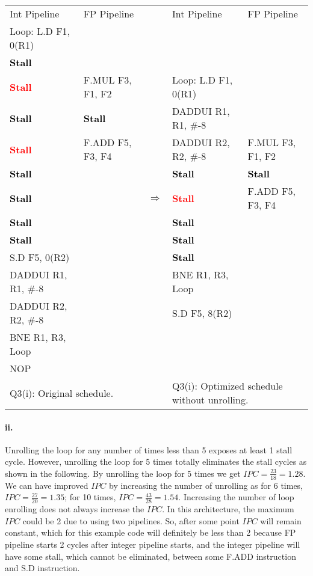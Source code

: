 \documentclass[11pt]{article}
\renewcommand{\part}[1]{\paragraph*{{#1}.}}
\newcommand{\code}[1]{\textsf{#1}}
\newcommand{\stall}{\textcolor{red}{\textbf{Stall}}}
\newcommand{\cellstall}{\cellcolor{red!25}\textcolor{black}{\textbf{Stall}}}
\begin{document}
\begin{table}[h]
\center
\small
\begin{tabular}{llcll}
	 Int Pipeline & FP Pipeline & & Int Pipeline & FP Pipeline \\
	 \code{Loop:} \code{L.D F1, 0(R1)} &  & & & \\
	 \cellstall &  & & & \\
	 \stall & \code{F.MUL F3, F1, F2} & & \code{Loop:} \code{L.D F1, 0(R1)} &  \\
	 \cellstall & \cellstall & & \code{DADDUI R1, R1, \#-8} &  \\
	 \stall & \code{F.ADD F5, F3, F4} & & \code{DADDUI R2, R2, \#-8} & \code{F.MUL F3, F1, F2} \\
	 \cellstall &  & & \cellstall & \cellstall \\
	 \cellstall &  & $\Rightarrow$ & \stall & \code{F.ADD F5, F3, F4} \\
	 \cellstall &  & & \cellstall &  \\
	 \cellstall &  & &  \cellstall &   \\
	 \code{S.D F5, 0(R2)} &  & & \cellstall &  \\
	 \code{DADDUI R1, R1, \#-8} &  & &  \code{BNE R1, R3, Loop} &  \\
	 \code{DADDUI R2, R2, \#-8} &  & &  \code{S.D F5, 8(R2)} &  \\
	 \code{BNE R1, R3, Loop}  &  & &  &  \\
	 \code{NOP} &  & & & \\
	 \multicolumn{2}{l}{Q3(i): Original schedule.} & & \multicolumn{2}{l}{Q3(i): Optimized schedule without unrolling.} 
\end{tabular}
\label{tbl:q3-p1}
\end{table}

\part{ii} Unrolling the loop for any number of times less than 5 exposes at least 1 stall cycle. However, unrolling the loop for 5 times totally eliminates the stall cycles as shown in the following. By unrolling the loop for 5 times we get $IPC=\frac{23}{18}=1.28$. We can have improved $IPC$ by increasing the number of unrolling as for 6 times, $IPC=\frac{27}{20}=1.35$; for 10 times, $IPC=\frac{43}{28}=1.54$. Increasing the number of loop enrolling does not always increase the $IPC$. In this architecture, the maximum $IPC$ could be 2 due to using two pipelines. So, after some point $IPC$ will remain constant, which for this example code will definitely be less than 2 because FP pipeline starts 2 cycles after integer pipeline starts, and the integer pipeline will have some stall, which cannot be eliminated, between some \code{F.ADD} instruction and \code{S.D} instruction.
\end{document}
